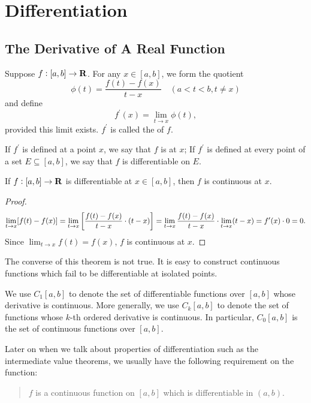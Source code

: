 \chapter{Differentiation}
\section{The Derivative of A Real Function}
\begin{definition}
Suppose $f:[a,b]\to\mathbf R$. For any $x\in[a,b]$, we form the quotient
\[\phi(t)=\frac{f(t)-f(x)}{t-x}\quad(a<t<b,t\neq x)\]
and define
\[f^\prime(x)=\lim_{t\to x}\phi(t),\]
provided this limit exists. $f^\prime$ is called the  of $f$.

If $f^\prime$ is defined at a point $x$, we say that $f$ is  at $x$; If $f^\prime$ is defined at every point of a set $E\subseteq[a,b]$, we say that $f$ is differentiable on $E$.
\end{definition}

\begin{lemma}\label{lemma:diff-cont}
If $f:[a,b]\to\mathbf R$ is differentiable at $x\in[a,b]$, then $f$ is continuous at $x$.
\end{lemma}

\begin{proof}
\[\lim_{t\to x}[f(t)-f(x)]=\lim_{t\to x}\left[\frac{f(t)-f(x)}{t-x}\cdot(t-x)\right]=\lim_{t\to x}\frac{f(t)-f(x)}{t-x}\cdot\lim_{t\to x}(t-x)=f^\prime(x)\cdot0=0.\]
Since $\displaystyle\lim_{t\to x}f(t)=f(x)$, $f$ is continuous at $x$.
\end{proof}

\begin{remark}
The converse of this theorem is not true. It is easy to construct continuous functions which fail to be differentiable at isolated points.
\end{remark}

\begin{notation}
We use $C_1[a,b]$ to denote the set of differentiable functions over $[a,b]$ whose derivative is continuous. More generally, we use $C_k[a,b]$ to denote the set of functions whose $k$-th ordered derivative is continuous. In particular, $C_0[a,b]$ is the set of continuous functions over $[a,b]$.
\end{notation}

Later on when we talk about properties of differentiation such as the intermediate value theorems, we usually have the following requirement on the function:
\begin{quote}
$f$ is a continuous function on $[a,b]$ which is differentiable in $(a,b)$.
\end{quote}

